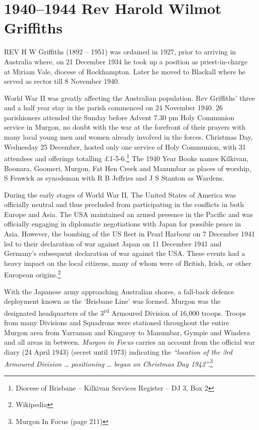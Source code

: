\chapter{1940--1944 Rev Harold Wilmot Griffiths}
\nobalance


\lettrine[lines=3]{R}{EV}
 H W Griffiths (1892 -- 1951) was ordained in 1927, prior to arriving in Australia where, on 21 December 1934 he took up a position as priest-in-charge at Miriam Vale, diocese of Rockhampton. Later he moved to Blackall where he served as rector till 8 November 1940.

World War II was greatly affecting the Australian population. Rev Griffiths' three and a half year stay in the parish commenced on 24 November 1940. 26 parishioners attended the Sunday before Advent 7.30 pm Holy Communion service in Murgon, no doubt with the war at the forefront of their prayers with many local young men and women already involved in the forces. Christmas Day, Wednesday 25 December, hosted only one service of Holy Communion, with 31 attendees and offerings totalling \pounds1-5-6.\footnote{Diocese of Brisbane -- Kilkivan Services Register -- DJ 3, Box 2} The 1940 Year Books names Kilkivan, Boonara, Goomeri, Murgon, Fat Hen Creek and Manumbar as places of worship, S Fenwick as synodsman with R B Jeffries and J S Stanton as Wardens.


During the early stages of World War II, The United States of America was officially neutral and thus precluded from participating in the conflicts in both Europe and Asia. The USA maintained an armed presence in the Pacific and was officially engaging in diplomatic negotiations with Japan for possible peace in Asia. However, the bombing of the US fleet in Pearl Harbour on 7 December 1941 led to their declaration of war against Japan on 11 December 1941 and Germany's subsequent declaration of war against the USA. These events had a heavy impact on the local citizens, many of whom were of British, Irish, or other European origins.\footnote{Wikipedia}


With the Japanese army approaching Australian shores, a fall-back defence deployment known as the `Brisbane Line' was formed. Murgon was the designated headquarters of the 3\textsuperscript{rd} Armoured Division of 16,000 troops. Troops from many Divisions and Squadrons were stationed throughout the entire Murgon area from Yarraman and Kingaroy to Manumbar, Gympie and Windera and all areas in between. \emph{Murgon in Focus} carries an account from the official war diary (24 April 1943) (secret until 1973) indicating the \emph{``location of the 3rd Armoured Division \ldots{} positioning \ldots{} began on Christmas Day 1942''.}\footnote{Murgon In Focus (page 211)}


